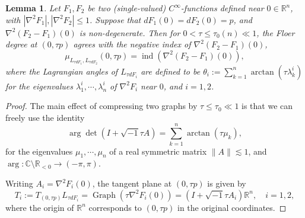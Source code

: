 \documentclass[11pt,a4paper]{article}
\numberwithin{equation}{section}%
\newtheorem{lem}[thm]{Lemma}
\theoremstyle{definition}
\newcommand{\R}{\mathbb{R}}
\newcommand{\C}{\mathbb{C}}
\begin{document}
\begin{lem}\label{lem:floerdegreeforgraph} 
      Let $F_1,F_2$ be two (single-valued) $C^\infty$-functions defined near $0\in \R^n$, with $|\nabla^2 F_1|,|\nabla^2 F_2|\leqslant 1$. Suppose that $dF_1(0)=dF_2(0)=p$, and $\nabla^2(F_2-F_1)(0)$ is non-degenerate. Then
      for $0<\tau\leqslant \tau_0(n)\ll 1$, the Floer degree at $(0,\tau p)$ agrees with the negative index of $\nabla^2(F_2-F_1)(0)$, 
      $$\mu_{L_{\tau dF_1},L_{\tau dF_2}}(0,\tau p)=\operatorname{ind}(\nabla^2(F_2-F_1)(0)),$$ where the Lagrangian angles of $L_{\tau dF_i}$ are defined to be $\theta_i:=\sum\limits_{k=1}^n \arctan (\tau \lambda_k^i)$ for the eigenvalues $\lambda_1^i,\cdots,\lambda_n^i$ of $\nabla^2F_i$ near $0$, and $i=1,2$.    
   \end{lem}
   \begin{proof} The main effect of compressing two graphs by $\tau\leqslant \tau_0\ll1$ is that we can freely use the identity 
   $$\arg \det(I+\sqrt{-1}\tau A)=\sum_{k=1}^n\arctan (\tau \mu_k), $$
for the eigenvalues $\mu_1,\cdots,\mu_n$ of a real symmetric matrix $\|A\|\lesssim 1$, and $\arg :\C\setminus \R_{<0}\to (-\pi,\pi)$.  
   
       Writing $A_i=\nabla^2F_i(0)$, the tangent plane at $(0,\tau p)$ is given by
       $$T_i:=T_{(0,\tau p)}L_{\tau dF_i}=\operatorname{Graph}(\tau\nabla^2F_i(0))=(I+\sqrt{-1}\tau A_i)\R^n,\quad i=1,2, $$
       where the origin of $\R^n$ corresponds to $(0,\tau p)$ in the original coordinates. 
       

\end{proof}
\end{document}

